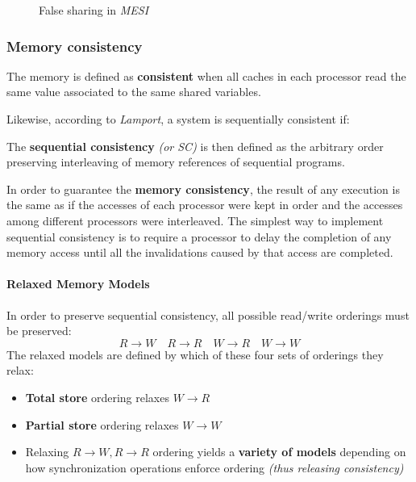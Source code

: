 \documentclass[english]{article}
\begin{document}
\begin{figure}[htbp]
  \centering
  \bigskip
  \caption{False sharing in \textit{MESI}}
  \label{fig:MESI-false-sharing}
  \bigskip
\end{figure}

\subsubsection{Memory consistency}

The memory is defined as \textbf{consistent} when all caches in each processor read the same value associated to the same shared variables.

Likewise, according to \textit{Lamport}, a system is sequentially consistent if:


The \textbf{sequential consistency} \textit{(or SC)} is then defined as the arbitrary order preserving interleaving of memory references of sequential programs.

\bigskip
In order to guarantee the \textbf{memory consistency}, the result of any execution is the same as if the accesses of each processor were kept in order and the accesses among different processors were interleaved.
The simplest way to implement sequential consistency is to require a processor to delay the completion of any memory access until all the invalidations caused by that access are completed.

\paragraph{Relaxed Memory Models}

In order to preserve sequential consistency, all possible read/write orderings must be preserved:
\[R \rightarrow W \quad R \rightarrow R \quad W \rightarrow R \quad W \rightarrow W\]
The relaxed models are defined by which of these four sets of orderings they relax:

\begin{itemize}
  \item \textbf{Total store} ordering relaxes \(W \rightarrow R\)
  \item \textbf{Partial store} ordering relaxes \(W \rightarrow W\)
  \item Relaxing \(R \rightarrow W, R \rightarrow R\) ordering yields a \textbf{variety of models} depending on how synchronization operations enforce ordering \textit{(thus releasing consistency)}
\end{itemize}
\end{document}
